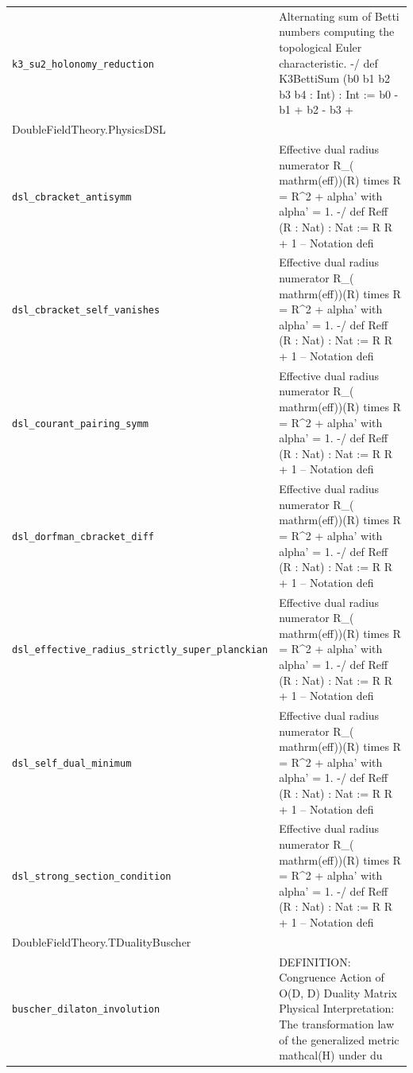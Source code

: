 \begin{longtable}{p{}p{}}
\quad\texttt{\footnotesize k3\_su2\_holonomy\_reduction} & {\footnotesize Alternating sum of Betti numbers computing the topological Euler characteristic. -/ def K3BettiSum (b0 b1 b2 b3 b4 : Int) : Int := b0 - b1 + b2 - b3 +} \\
\multicolumn{2}{l}{\textsf{\small DoubleFieldTheory.PhysicsDSL}} \\
\quad\texttt{\footnotesize dsl\_cbracket\_antisymm} & {\footnotesize Effective dual radius numerator R\_( mathrm(eff))(R)  times R = R\^{}2 +  alpha' with  alpha' = 1. -/ def Reff (R : Nat) : Nat := R R + 1 -- Notation defi} \\
\quad\texttt{\footnotesize dsl\_cbracket\_self\_vanishes} & {\footnotesize Effective dual radius numerator R\_( mathrm(eff))(R)  times R = R\^{}2 +  alpha' with  alpha' = 1. -/ def Reff (R : Nat) : Nat := R R + 1 -- Notation defi} \\
\quad\texttt{\footnotesize dsl\_courant\_pairing\_symm} & {\footnotesize Effective dual radius numerator R\_( mathrm(eff))(R)  times R = R\^{}2 +  alpha' with  alpha' = 1. -/ def Reff (R : Nat) : Nat := R R + 1 -- Notation defi} \\
\quad\texttt{\footnotesize dsl\_dorfman\_cbracket\_diff} & {\footnotesize Effective dual radius numerator R\_( mathrm(eff))(R)  times R = R\^{}2 +  alpha' with  alpha' = 1. -/ def Reff (R : Nat) : Nat := R R + 1 -- Notation defi} \\
\quad\texttt{\footnotesize dsl\_effective\_radius\_strictly\_super\_planckian} & {\footnotesize Effective dual radius numerator R\_( mathrm(eff))(R)  times R = R\^{}2 +  alpha' with  alpha' = 1. -/ def Reff (R : Nat) : Nat := R R + 1 -- Notation defi} \\
\quad\texttt{\footnotesize dsl\_self\_dual\_minimum} & {\footnotesize Effective dual radius numerator R\_( mathrm(eff))(R)  times R = R\^{}2 +  alpha' with  alpha' = 1. -/ def Reff (R : Nat) : Nat := R R + 1 -- Notation defi} \\
\quad\texttt{\footnotesize dsl\_strong\_section\_condition} & {\footnotesize Effective dual radius numerator R\_( mathrm(eff))(R)  times R = R\^{}2 +  alpha' with  alpha' = 1. -/ def Reff (R : Nat) : Nat := R R + 1 -- Notation defi} \\
\multicolumn{2}{l}{\textsf{\small DoubleFieldTheory.TDualityBuscher}} \\
\quad\texttt{\footnotesize buscher\_dilaton\_involution} & {\footnotesize DEFINITION: Congruence Action of O(D, D) Duality Matrix Physical Interpretation: The transformation law of the generalized metric  mathcal(H) under du} \\

\end{longtable}
